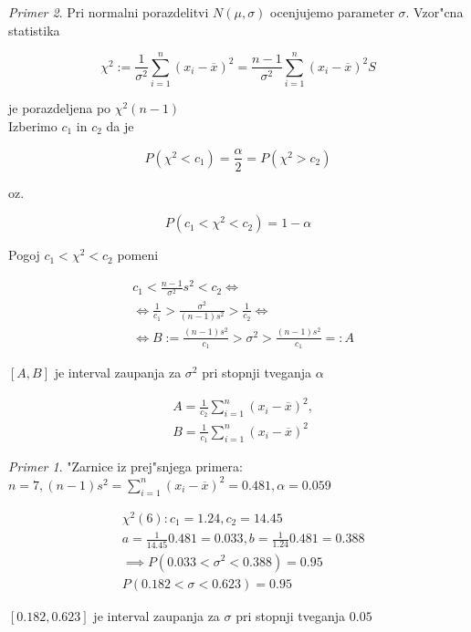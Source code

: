 \documentclass[a4paper,12pt]{article}
\theoremstyle{definition}
\theoremstyle{remark}
\newtheorem*{ex}{Primer}
\begin{document}
\begin{ex}
    Pri normalni porazdelitvi $N(\mu, \sigma)$ ocenjujemo parameter $\sigma$. Vzor"cna statistika

    \begin{equation*}
        \chi^2 := \frac{1}{\sigma^2} \sum_{i=1}^{n} (x_i - \overline{x})^2 =
        \frac{n-1}{\sigma^2} \sum_{i=1}^{n} (x_i - \overline{x})^2S 
    \end{equation*}

    je porazdeljena po $\chi^2(n-1)$ \\
    Izberimo $c_1$ in $c_2$ da je

    \begin{equation*}
        P(\chi^2 < c_1) = \frac{\alpha}{2} = P(\chi^2 > c_2)
    \end{equation*}

    oz.

    \begin{equation*}
        P(c_1 < \chi^2 < c_2) = 1 - \alpha
    \end{equation*}

    Pogoj $c_1 < \chi^2 < c_2$ pomeni

    \begin{align*}
        &c_1 < \frac{n-1}{\sigma^2} s^2 < c_2 \iff \\
        &\iff \frac{1}{c_1} > \frac{\sigma^2}{(n-1)s^2} > \frac{1}{c_2} \iff \\
        &\iff B := \frac{(n-1)s^2}{c_1} > \sigma^2 > \frac{(n-1)s^2}{c_1} =: A 
    \end{align*}

    $[A,B]$ je interval zaupanja za $\sigma^2$ pri stopnji tveganja $\alpha$

    \begin{align*}
        &A = \frac{1}{c_2} \sum_{i=1}^{n} (x_i - \overline{x})^2, \\
        &B = \frac{1}{c_1} \sum_{i=1}^{n} (x_i - \overline{x})^2
    \end{align*}

    \begin{ex}
        "Zarnice iz prej"snjega primera: \\
        $n=7, (n-1)s^2 = \sum_{i=1}^{n} (x_i - \overline{x})^2 = 0.481, \alpha = 0.05$9

        \begin{align*}
            &\chi^2(6): c_1 = 1.24, c_2 = 14.45 \\
            &a = \frac{1}{14.45} 0.481 = 0.033, b = \frac{1}{1.24} 0.481 = 0.388 \\
            &\implies P(0.033 < \sigma^2 < 0.388) = 0.95 \\
            &P(0.182 < \sigma < 0.623) = 0.95
        \end{align*}

        $[0.182, 0.623]$ je interval zaupanja za $\sigma$ pri stopnji tveganja $0.05$
    \end{ex}
\end{ex}
\end{document}

